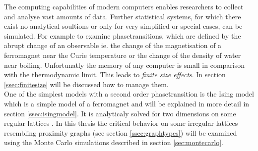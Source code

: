 The computing capabilities of modern computers enables researchers to
collect and analyse vast amounts of data.
Further statistical systems, for which there exist no analytical soultions
or only for very simplified or special cases, can be simulated.
For example to examine phasetransitions, which are defined by the abrupt
change of an observable ie. the change of the magnetisation of a
ferromagnet near the Curie temperature or the change of the density of
water near boiling. Unfortunatly the memory of any computer is small in
comparison with the thermodynamic limit.
This leads to \emph{finite size effects}. In section \ref{ssec:finitesize}
will be discussed how to manage them.\\

One of the simplest models with a second order phasetransition is the
Ising model \cite{Ising1925} which is a simple model of a ferromagnet
and will be explained in more detail in section \ref{ssec:isingmodel}.
It is analyticaly solved for two dimensions on some regular lattices
\cite{Onsager1944} \cite{Wannier1945}.
In this thesis the critical behavior on some irregular lattices
resembling proximity graphs (see section \ref{ssec:graphtypes}) will be
examined using the Monte Carlo simulations described in section
\ref{sec:montecarlo}.
